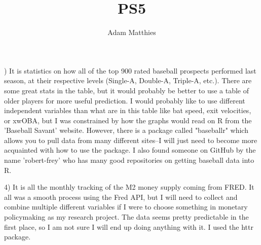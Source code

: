 \documentclass[12pt]{article}
\begin{document}
 
\title{PS5}
\author{Adam Matthies\\}

) It is statistics on how all of the top 900 rated baseball prospects performed last season, at their respective levels (Single-A, Double-A, Triple-A, etc.). There are some great stats in the table, but it would probably be better to use a table of older players for more useful prediction. I would probably like to use different independent variables than what are in this table like bat speed, exit velocities, or xwOBA, but I was constrained by how the graphs would read on R from the 'Baseball Savant' website. However, there is a package called "baseballr" which allows you to pull data from many different sites--I will just need to become more acquainted with how to use the package. I also found someone on GitHub by the name 'robert-frey' who has many good repositories on getting baseball data into R. 

4) It is all the monthly tracking of the M2 money supply coming from FRED. It all was a smooth process using the Fred API, but I will need to collect and combine multiple different variables if I were to choose something in monetary policymaking as my research project. The data seems pretty predictable in the first place, so I am not sure I will end up doing anything with it. I used the httr package.
 
\end{document}
